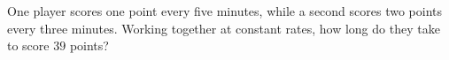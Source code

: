 One player scores one point every five minutes, while a second scores two points every three minutes. Working together at constant rates, how long do they take to score $39$ points?
